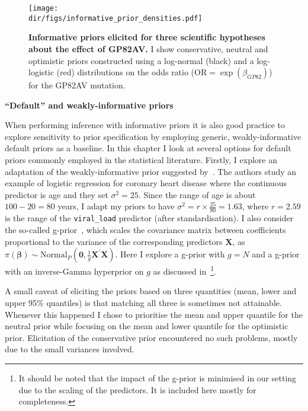 \begin{figure}[!ht]
  \centering
  \texttt{[image: \\dir/figs/informative\_prior\_densities.pdf]}
  \caption[Informative priors for the effect of GP82AV]{\textbf{Informative priors elicited for three scientific hypotheses about the effect of GP82AV.}
  I show conservative, neutral and optimistic priors constructed using a log-normal (black) and a log-logistic (red) distributions on the odds ratio ($\text{OR} = \exp(\beta_{GP82})$) for the GP82AV mutation.
  }
  \label{fig:informativePriors}
\end{figure}

\textbf{``Default'' and weakly-informative priors}

When performing inference with informative priors it is also good practice to explore sensitivity to prior specification by employing generic, weakly-informative default priors as a baseline.
In this chapter I look at several options for default priors commonly employed in the statistical literature.
Firstly, I explore an adaptation of the weakly-informative prior suggested by~\cite{Seaman2012}.
The authors study an example of logistic regression for coronary heart disease where the continuous predictor is age and they set $\sigma^2 = 25$.
Since the range of age is about $100-20 = 80$ years, I adapt my priors to have $\sigma^2 = r \times \frac{25}{80} = 1.63$, where $r = 2.59$ is the range of the \verb|viral_load| predictor (after standardisation).
I also consider the so-called g-prior~\citep{Zellner1986}, which scales the covariance matrix between coefficients proportional to the variance of the corresponding predictors $\boldsymbol X$, as $\pi(\boldsymbol\beta) \sim \text{Normal}_P(\boldsymbol 0, \frac{1}{g} \boldsymbol X^\prime\boldsymbol X)$.
Here I explore a g-prior with $g = N$ and a g-prior with an inverse-Gamma hyperprior on $g$ as discussed in~\cite{Liang2008}\footnote{It should be noted that the impact of the g-prior is minimised in our setting due to the scaling of the predictors. It is included here mostly for completeness.}.

A small caveat of eliciting the priors based on three quantities (mean, lower and upper 95\% quantiles) is that matching all three is sometimes not attainable.
Whenever this happened I chose to prioritise the mean and upper quantile for the neutral prior while focusing on the mean and lower quantile for the optimistic prior.
Elicitation  of the conservative prior encountered no such problems, mostly due to the small variances involved.


